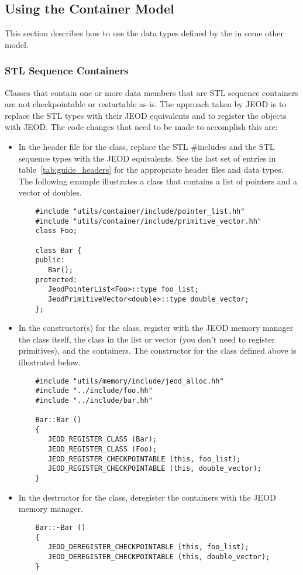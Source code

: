 \subsection{Using the Container Model}
This section describes how to use the data types defined by the
\ModelDesc in some other model.

\subsubsection{STL Sequence Containers}
Classes that contain one or more data members that are STL sequence containers
are not checkpointable or restartable as-is. The approach taken by JEOD is
to replace the STL types with their JEOD equivalents and to register the
objects with JEOD. The code changes that need to be made to accomplish this are:
\begin{itemize}
  \item In the header file for the class, replace the STL \#includes
    and the STL sequence types with the JEOD equivalents.
    See the last set of entries in table~\ref{tab:guide_headers}
    for the appropriate header files and data types.
    The following example illustrates a class that contains a list
    of pointers and a vector of doubles.
    \begin{verbatim}
    #include "utils/container/include/pointer_list.hh"
    #include "utils/container/include/primitive_vector.hh"
    class Foo;

    class Bar {
    public:
       Bar();
    protected:
       JeodPointerList<Foo>::type foo_list;
       JeodPrimitiveVector<double>::type double_vector;
    };
    \end{verbatim}
  \item In the constructor(s) for the class, register with the
    JEOD memory manager the class itself, the class in the list or
    vector (you don't need to register primitives), and the containers.
    The constructor for the class defined above is illustrated below.
    \begin{verbatim}
    #include "utils/memory/include/jeod_alloc.hh"
    #include "../include/foo.hh"
    #include "../include/bar.hh"

    Bar::Bar ()
    {
       JEOD_REGISTER_CLASS (Bar);
       JEOD_REGISTER_CLASS (Foo);
       JEOD_REGISTER_CHECKPOINTABLE (this, foo_list);
       JEOD_REGISTER_CHECKPOINTABLE (this, double_vector);
    }
    \end{verbatim}
  \item In the destructor for the class, deregister the containers
    with the JEOD memory manager.
    \begin{verbatim}
    Bar::~Bar ()
    {
       JEOD_DEREGISTER_CHECKPOINTABLE (this, foo_list);
       JEOD_DEREGISTER_CHECKPOINTABLE (this, double_vector);
    }
    \end{verbatim}
\end{itemize}

